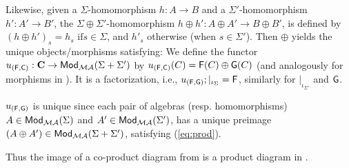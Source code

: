 \begin{PROOF}
Likewise, given a $\Sigma$-homomorphism $h:A \to B$ and a
$\Sigma'$-homomorphism  $h':A' \to B'$,  the $\Sigma \oplus \Sigma'$-homomorphism $h \oplus
h': A \oplus A' \to B \oplus B'$, is defined by $(h \oplus h')_s = h_s \mbox{ if
} s \in \Sigma$, and $h'_s$ otherwise (when $s\in\Sigma'$). 
Then $\oplus$ yields the unique objects/morphisms satisfying:
We define the functor $u_{({\sf {F}},{\sf {C}})}: {\bf C} \to
{\sf {Mod}}_{{\mathcal{MA}}}(\Sigma + \Sigma')$ by $u_{({\sf {F}},{\sf {C}})}({C})
= {\sf {F}}({C}) \oplus {\sf {G}}({C})$ (and analogously for morphisms in
). It
is a factorization, i.e., $u_{({\sf {F}},{\sf {G}})};|_{\iota_{\Sigma}}={\sf {F}}$, similarly for $|_{\iota_{\Sigma'}}$ and
${\sf {G}}$.

$u_{({\sf {F}}, {\sf {G}})}$ is unique since each pair of algebras
(resp. homomorphisms)  
$A\in{\sf {Mod}}_{{\mathcal{MA}}}(\Sigma)$ and $A'\in{\sf {Mod}}_{{\mathcal{MA}}}(\Sigma')$, has a unique preimage
$(A\oplus A')\in{\sf {Mod}}_{{\mathcal{MA}}}(\Sigma + \Sigma')$, satisfying (\ref{eq:prod}).

Thus the image of a co-product diagram from  is a product diagram in .
\end{PROOF}


